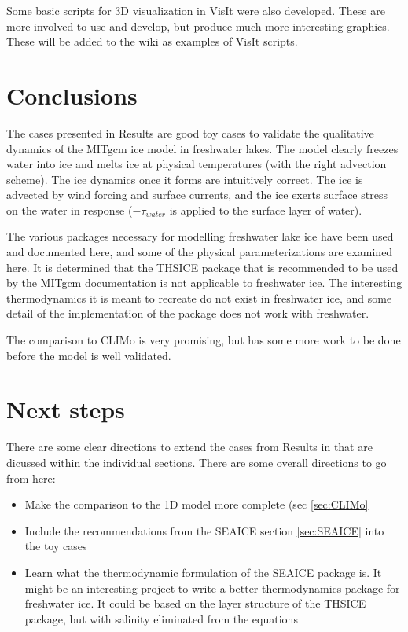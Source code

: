 \documentclass[11pt]{article}
\begin{document}
Some basic scripts for 3D visualization in VisIt were also developed. These are more involved to use and develop, but produce much more interesting graphics. These will be added to the wiki as examples of VisIt scripts.

\section{Conclusions}
The cases presented in Results are good toy cases to validate the qualitative dynamics of the MITgcm ice model in freshwater lakes. The model clearly freezes water into ice and melts ice at physical temperatures (with the right advection scheme). The ice dynamics once it forms are intuitively correct. The ice is advected by wind forcing and surface currents, and the ice exerts surface stress on the water in response ($-\tau_{water}$ is applied to the surface layer of water).

The various packages necessary for modelling freshwater lake ice have been used and documented here, and some of the physical parameterizations are examined here. It is determined that the THSICE package that is recommended to be used by the MITgcm documentation is not applicable to freshwater ice. The interesting thermodynamics it is meant to recreate do not exist in freshwater ice, and some detail of the implementation of the package does not work with freshwater.

The comparison to CLIMo is very promising, but has some more work to be done before the model is well validated.

\section{Next steps}
There are some clear directions to extend the cases from Results in that are dicussed within the individual sections. There are some overall directions to go from here:
\begin{itemize}
\item{Make the comparison to the 1D model more complete (sec \ref{sec:CLIMo}}
\item{Include the recommendations from the SEAICE section \ref{sec:SEAICE} into the toy cases}
\item{Learn what the thermodynamic formulation of the SEAICE package is. It might be an interesting project to write a better thermodynamics package for freshwater ice. It could be based on the layer structure of the THSICE package, but with salinity eliminated from the equations}
\end{itemize}
\end{document}
